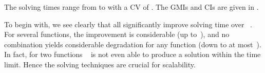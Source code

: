 %
The solving times range from
\printMinSolvingTime{
  \SolvTechEnableOnlyAllGoodPrePlusSolvingTimeSpeedupNonePrePlusSolvingTimeAvgMin,
  \SolvTechEnableOnlyAllGoodPrePlusSolvingTimeSpeedupPrePlusSolvingTimeAvgMin,
  \SolvTechDisableAllBadPrePlusSolvingTimeSpeedupPrePlusSolvingTimeAvgMin,
  \SolvTechDisableAllPrePlusSolvingTimeSpeedupPrePlusSolvingTimeAvgMin
} to
\printMaxSolvingTime{
  \SolvTechEnableOnlyAllGoodPrePlusSolvingTimeSpeedupNonePrePlusSolvingTimeAvgMax,
  \SolvTechEnableOnlyAllGoodPrePlusSolvingTimeSpeedupPrePlusSolvingTimeAvgMax,
  \SolvTechDisableAllBadPrePlusSolvingTimeSpeedupPrePlusSolvingTimeAvgMax,
  \SolvTechDisableAllPrePlusSolvingTimeSpeedupPrePlusSolvingTimeAvgMax
} with a \gls{CV} of
\numMaxOf{
  \SolvTechEnableOnlyAllGoodPrePlusSolvingTimeSpeedupNonePrePlusSolvingTimeCvMax,
  \SolvTechEnableOnlyAllGoodPrePlusSolvingTimeSpeedupPrePlusSolvingTimeCvMax,
  \SolvTechDisableAllBadPrePlusSolvingTimeSpeedupPrePlusSolvingTimeCvMax,
  \SolvTechDisableAllPrePlusSolvingTimeSpeedupPrePlusSolvingTimeCvMax
}.
%
The \glspl{GMI} and \glspl{CI} are given in
.

To begin with, we see clearly that all 
significantly improve solving time over ~.
%
For several \glspl{function}, the improvement is considerable (up
to~\printMaxSpeedup{%
  \SolvTechEnableOnlyAllGoodPrePlusSolvingTimeSpeedupPrePlusSolvingTimeZeroCenteredSpeedupMax,
  \SolvTechDisableAllBadPrePlusSolvingTimeSpeedupPrePlusSolvingTimeZeroCenteredSpeedupMax,
  \SolvTechDisableAllPrePlusSolvingTimeSpeedupPrePlusSolvingTimeZeroCenteredSpeedupMax
}), and no combination yields considerable degradation for any \gls{function}
(down
to at most~\printMinSpeedup{%
  \SolvTechEnableOnlyAllGoodPrePlusSolvingTimeSpeedupPrePlusSolvingTimeZeroCenteredSpeedupMin,
  \SolvTechDisableAllBadPrePlusSolvingTimeSpeedupPrePlusSolvingTimeZeroCenteredSpeedupMin,
  \SolvTechDisableAllPrePlusSolvingTimeSpeedupPrePlusSolvingTimeZeroCenteredSpeedupMin
}).
%
In fact, for two \glspl{function} ~ is not even able to produce a \gls{solution}
within the time limit.
%
Hence the solving techniques are crucial for scalability.

